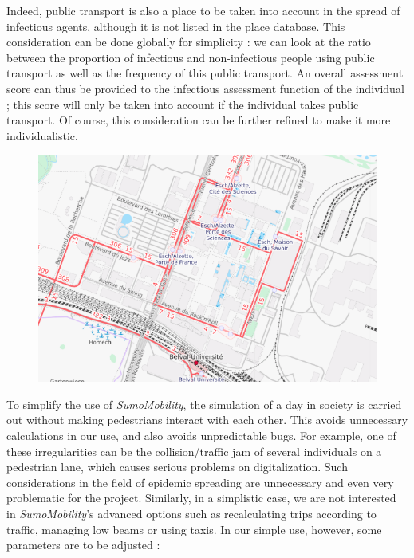 Indeed, public transport is also a place to be taken into account in the spread of infectious agents, although it is not listed in the place database. This consideration can be done globally for simplicity : we can look at the ratio between the proportion of infectious and non-infectious people using public transport as well as the frequency of this public transport. An overall assessment score can thus be provided to the infectious assessment function of the individual ; this score will only be taken into account if the individual takes public transport. Of course, this consideration can be further refined to make it more individualistic.\\

\begin{figure}[h]
  \centering
  \includegraphics[width=0.8\linewidth]{media/belval_osm_tp.png}
  \caption{}
  \label{fig:belvalosmtp}
\end{figure}

To simplify the use of \textit{SumoMobility}, the simulation of a day in society is carried out without making pedestrians interact with each other. This avoids unnecessary calculations in our use, and also avoids unpredictable bugs. For example, one of these irregularities can be the collision/traffic jam of several individuals on a pedestrian lane, which causes serious problems on digitalization. Such considerations in the field of epidemic spreading are unnecessary and even very problematic for the project. Similarly, in a simplistic case, we are not interested in \textit{SumoMobility}'s advanced options such as recalculating trips according to traffic, managing low beams or using taxis. In our simple use, however, some parameters are to be adjusted :\\


